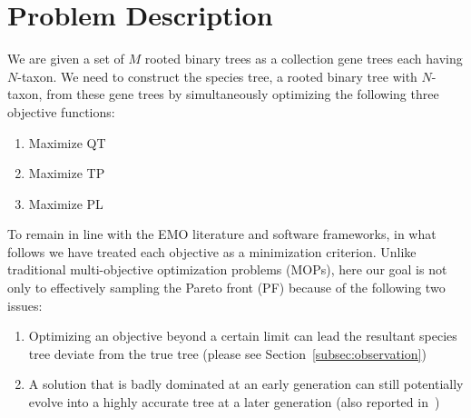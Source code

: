 \section{Problem Description}
\label{sec:problem}
We are given a set of $M$ rooted binary trees as a collection gene trees each having $N$-taxon. We need to construct the species tree, a rooted binary tree with $N$-taxon, from these gene trees by simultaneously optimizing the following three objective functions:  
\begin{enumerate}[label=$F_\arabic*$)]        
	\item Maximize QT 
	\item Maximize TP
	\item Maximize PL 
\end{enumerate}
 To remain in line with the EMO literature and software frameworks, in what follows we have treated each objective as a minimization criterion. Unlike traditional multi-objective optimization problems (MOPs), here our goal is not only to effectively sampling the Pareto front (PF) because of the following two issues:
\begin{enumerate}[label=$I_\arabic*$]
	\item \label{item:i1} Optimizing an objective beyond a certain limit can lead the resultant species tree deviate from the true tree (please see Section~\ref{subsec:observation})
	\item \label{item:i2} A solution that is badly dominated at an early generation can still potentially evolve into a highly accurate tree at a later generation (also reported in~\cite{qu2010multi})
\end{enumerate}

